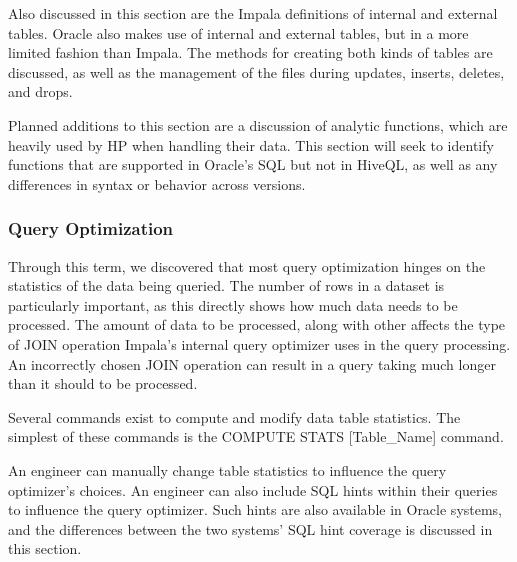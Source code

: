 \documentclass[onecolumn, draftclsnofoot,10pt, compsoc]{IEEEtran}
\begin{document}
Also discussed in this section are the Impala definitions of internal and external tables.
Oracle also makes use of internal and external tables, but in a more limited fashion than Impala.
The methods for creating both kinds of tables are discussed, as well as the management of the files during updates, inserts, deletes, and drops. 

Planned additions to this section are a discussion of analytic functions, which are heavily used by HP when handling their data.
This section will seek to identify functions that are supported in Oracle’s SQL but not in HiveQL, as well as any differences in syntax or behavior across versions. 

\subsubsection{Query Optimization}
Through this term, we discovered that most query optimization hinges on the statistics of the data being queried.
The number of rows in a dataset is particularly important, as this directly shows how much data needs to be processed.
The amount of data to be processed, along with other  affects the type of JOIN operation Impala’s internal query optimizer uses in the query processing.
An incorrectly chosen JOIN operation can result in a query taking much longer than it should to be processed. 

Several commands exist to compute and modify data table statistics. The simplest of these commands is the COMPUTE STATS [Table\_Name] command. 

An engineer can manually change table statistics to influence the query optimizer’s choices.
An engineer can also include SQL hints within their queries to influence the query optimizer.
Such hints are also available in Oracle systems, and the differences between the two systems’ SQL hint coverage is discussed in this section.  
\end{document}
